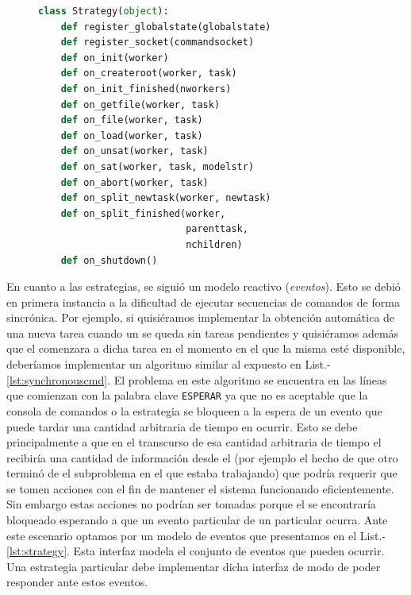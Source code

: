 \newcommand{\lst}{List.-}

\begin{figure}
\begin{footnotesize}
\begin{lstlisting}[language=Python,caption=Interfaz Strategy,label=lst:strategy]
class Strategy(object):
	def register_globalstate(globalstate)
	def register_socket(commandsocket)
	def on_init(worker)
	def on_createroot(worker, task)
	def on_init_finished(nworkers)
	def on_getfile(worker, task)
	def on_file(worker, task)
	def on_load(worker, task)
	def on_unsat(worker, task)
	def on_sat(worker, task, modelstr)
	def on_abort(worker, task)
	def on_split_newtask(worker, newtask)
	def on_split_finished(worker, 
	                      parenttask, 
	                      nchildren)
	def on_shutdown()
\end{lstlisting}
\end{footnotesize}
\end{figure}

En cuanto a las estrategias, se siguió un modelo reactivo (\emph{eventos}).
Esto se debió en primera instancia a la dificultad de ejecutar secuencias de
comandos de forma sincrónica. Por ejemplo, si quisiéramos implementar la
obtención automática de una nueva tarea cuando un \w se queda sin tareas
pendientes y quisiéramos además que el \w comenzara a \solvear dicha tarea en
el momento en el que la misma esté disponible, deberíamos implementar un
algoritmo similar al expuesto en \lst\ref{lst:synchronouscmd}. El problema en
este algoritmo se encuentra en las líneas que comienzan con la palabra clave
\texttt{ESPERAR} ya que no es aceptable que la consola de comandos o la
estrategia se bloqueen a la espera de un evento que puede tardar una cantidad
arbitraria de tiempo en ocurrir. Esto se debe principalmente a que en el
transcurso de esa cantidad arbitraria de tiempo el \fend recibiría una
cantidad de información desde el \bend (por ejemplo el hecho de que otro \w
terminó de \solvear el subproblema en el que estaba trabajando) que podría
requerir que se tomen acciones con el fin de mantener el sistema funcionando
eficientemente. Sin embargo estas acciones no podrían ser tomadas porque el
\fend se encontraría bloqueado esperando a que un evento particular de un \w
particular ocurra. Ante este escenario optamos por un modelo de eventos que
presentamos en el \lst\ref{lst:strategy}. Esta interfaz modela el conjunto de
eventos que pueden ocurrir. Una estrategia particular debe implementar dicha
interfaz de modo de poder responder ante estos eventos.


